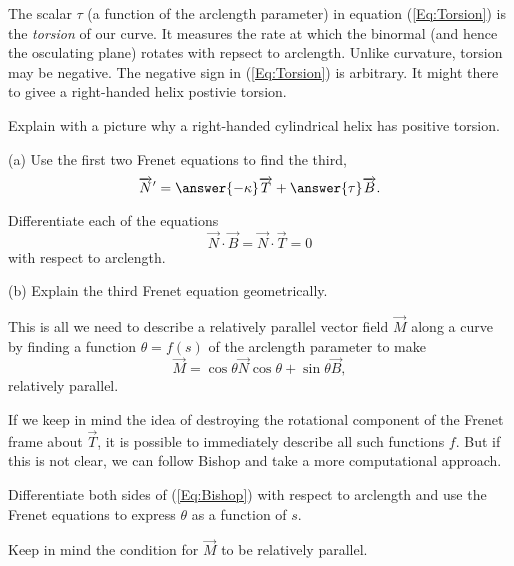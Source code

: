 \documentclass{ximera}
\begin{document}
The scalar $\tau$ (a function of the arclength parameter) in equation (\ref{Eq:Torsion}) is the \emph{torsion} of our curve. It measures the rate at which the binormal (and hence the osculating plane) rotates with repsect to arclength. Unlike curvature, torsion may be negative. The negative sign in (\ref{Eq:Torsion}) is arbitrary. It might there to givee a right-handed helix 
postivie torsion.

\begin{exercise} \label{E:dsft4etdg}
Explain with a picture why a right-handed cylindrical helix has positive torsion.
\end{exercise}

\begin{exercise}   \label{QQ:Podsfgttga}
(a) Use the first two Frenet equations to find the third,
\[
     \overrightarrow{N}^\prime = \answer{-\kappa} \overrightarrow{T} + \answer{\tau} \overrightarrow{B} .
\]
\begin{hint}
Differentiate each of the equations
\[
 \overrightarrow{N}\cdot \overrightarrow{B} = \overrightarrow{N}\cdot\overrightarrow{T} = 0
\]
with respect to arclength.
\end{hint}

(b) Explain the third Frenet equation geometrically.
\end{exercise}


This is all we need to describe a relatively parallel vector field $\overrightarrow{M}$ along a curve by finding a function $\theta = f(s)$ of the arclength parameter to make
\begin{equation}
          \overrightarrow{M} = \cos\theta \overrightarrow{N} \cos \theta + \sin\theta \overrightarrow{B} ,   \label{Eq:Bishop}
\end{equation}
relatively parallel.

If we keep in mind the idea of destroying the rotational component of the Frenet frame about $\overrightarrow{T}$, it is possible to immediately describe all such functions $f$. But if this is not clear, we can follow Bishop and take a more computational approach. 

\begin{exercise}  \label{E:dfstr35tr43}
Differentiate both sides of (\ref{Eq:Bishop}) with respect to arclength and use the Frenet equations to express $\theta$ as a function of $s$.

\begin{hint}
Keep in mind the condition for $\overrightarrow{M}$ to be relatively parallel. 
\end{hint}
\end{exercise}
\end{document}
